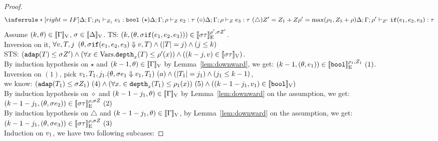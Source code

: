 \documentclass[a4paper,11pt]{article}
\theoremstyle{definition}
\begin{document}
\begin{proof}
\[
    \inferrule*[right = IF]{
      \Delta; \Gamma; \dmap_1 \tvdash{\nnatA_1} \expr_1: \tbool ~ (\star) \\
      \Delta; \Gamma; \dmap \tvdash{\nnatA} \expr_2: \type ~(\diamond) \\
      \Delta; \Gamma; \dmap \tvdash{\nnatA} \expr_3: \type ~(\triangle) \\\\
      \nnatA' = \nnatA_1 + \nnatA \\
      \dmap' = \max(\dmap_1, \nnatA_1 + \dmap)
    }{
      \Delta; \Gamma; \dmap' \tvdash{\nnatA'} \eif(\expr_1, \expr_2, \expr_3):  \type
    }
\]
Assume $(k, \theta) \in [\![ \Gamma ]\!]_{\text{V}}$, $ \sigma \in [\![ \Delta ]\!]_{\text{V}}$. TS: $(k, (\theta, \sigma \mathtt{if}(e_1, e_2, e_3))) \in [\![ \sigma \tau ]\!]_{\text{E}}^{\rho', \sigma Z'}$.\\
%
Inversion on it, $\forall v, T, j$ $(\theta, \sigma  \mathtt{if}(e_1, e_2, e_3) \mathrel{\Downarrow} v, T) \land (|T| = j) \land (j \leq k)$\\
%
STS: $(\mathtt{adap}(T) \leq \sigma  Z') \land (\forall x \in \mbox{Vars}. \mathtt{depth}_{x}(T) \leq \rho'(x)) \land ((k - j, v) \in [\![ \sigma \tau ]\!]_{\text{V}})$.\\
%
By induction hypothesis on $\star$ and $(k-1, \theta) \in
[\![ \Gamma ]\!]_{\text{V}}$ by  Lemma~\ref{lem:downward}, we get: $(k-1, (\theta, e_1)) \in [\![ \mathtt{bool} ]\!]_{\text{E}}^{\rho_1, Z_1} ~(1)$.\\
%
Inversion on $(1)$, pick $ v_1, T_1, j_1. (\theta, \sigma e_1 \mathrel{\Downarrow} v_1, T_1) ~ (a) \land (|T_1| = j_1) \land (j_1 \leq k-1)$,\\
%
we know: $(\mathtt{adap}(T_1) \leq \sigma Z_1)~(4) \land (\forall x. \in
\mathtt{depth}_{x}(T_1) \leq \rho_1(x)) ~(5) \land ((k -1- j_1, v_1) \in [\![ \mathtt{bool} ]\!]_{\text{V}})$\\
%
By induction hypothesis on $\diamond$
%
and $(k-1-j_1, \theta) \in [\![ \Gamma ]\!]_{\text{V}}$
%
by Lemma~\ref{lem:downward} on the assumption, 
%
we get: $(k-1-j_1, (\theta, \sigma e_2)) \in [\![ \sigma \tau ]\!]_{\text{E}}^{\rho, \sigma Z} ~(2)$\\
%
By induction hypothesis on $\triangle$ 
%
and $(k-1-j_1, \theta) \in [\![ \Gamma ]\!]_{\text{V}}$,
%
by Lemma~\ref{lem:downward} on the assumption, 
%
we get: $(k-1-j_1, (\theta, \sigma e_3)) \in [\![ \sigma \tau ]\!]_{\text{E}}^{\rho, \sigma Z} ~(3)$\\
%
Induction on $v_1$, we have two following subcases:


\end{proof}
\end{document}
